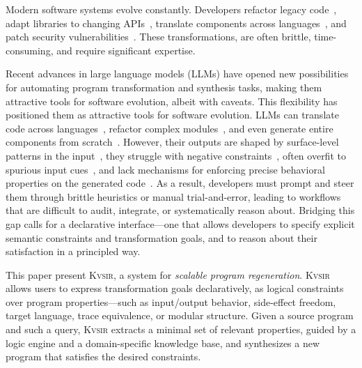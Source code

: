 \documentclass[sigplan]{acmart}
\newcommand{\sys}{{\scshape Kv{\textalpha}sir}\xspace}
\begin{document}
Modern software systems evolve constantly.
Developers refactor legacy code~\cite{Fowler99,Mens04,facebook2010redesigns,dropbox2014syncengine},
adapt libraries to changing APIs~\cite{dig2005role,kula2017empiricalstudyimpactrefactoring},
translate components across languages~\cite{manzoor_cli_python,gaultier_rewrite_cpp},
and patch security vulnerabilities~\cite{ikegami2022userefactoringsecurityvulnerability,schneier2013security_vulnerabilities}.
These transformations, are often brittle, time-consuming, and require significant expertise.

Recent advances in large language models (LLMs) have opened new possibilities for automating program transformation and synthesis tasks, making them attractive tools for software evolution, albeit with caveats.
This flexibility has positioned them as attractive tools for software evolution.
LLMs can translate code across languages~\cite{ou2025enhancingllmbasedcodetranslation},
refactor complex modules~\cite{ziftci2025migrating},
and even generate entire components from scratch~\cite{huynh2025largelanguagemodelscode}.
However, their outputs are shaped by surface-level patterns in the input~\cite{yang2025evaluatinggeneralizationcapabilitieslarge},
they struggle with negative constraints~\cite{hwang2024thinkpinkelephant,jiang2024llmsdreamelephantswhen},
often overfit to spurious input cues~\cite{xu2023llmfoolitselfpromptbased, wu2023deceptpromptexploitingllmdrivencode},
and lack mechanisms for enforcing precise behavioral properties on the generated code~\cite{roh2025breakthechainreasoningfailuresllms}.
As a result, developers must prompt and steer them through brittle heuristics or manual trial-and-error, leading to workflows that are difficult to audit, integrate, or systematically reason about.
Bridging this gap calls for a declarative interface---one that allows developers to specify explicit semantic constraints and transformation goals, and to reason about their satisfaction in a principled way.


This paper present \sys, a system for \emph{scalable program regeneration}.
\sys allows users
to express transformation goals declaratively, as logical constraints over
program properties---such as input/output behavior, side-effect freedom, target
language, trace equivalence, or modular structure.
Given a source program and
such a query, \sys extracts a minimal set of relevant properties, guided by a
logic engine and a domain-specific knowledge base, and synthesizes a new
program that satisfies the desired constraints.
\end{document}
